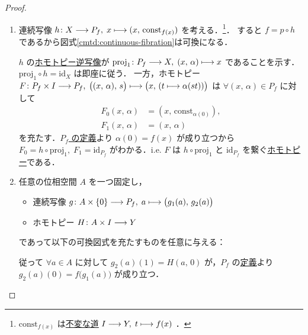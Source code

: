 \documentclass[algtopo_main]{subfiles}
\begin{document}
\begin{proof}
    \begin{enumerate}
        \item 連続写像 $h \colon X \longrightarrow P_f,\; x \longmapsto (x,\, \mathrm{const}_{f(x)})$ を考える．\footnote{$\mathrm{const}_{f(x)}$ は\hyperref[def:path-basic]{不変な道} $I \longrightarrow Y,\; t \longmapsto f(x)$ ．}．
        すると $f = p \circ h$ であるから図式\ref{cmtd:continuous-fibration}は可換になる．
        
        $h$ の\hyperref[def:homotopy-basic]{ホモトピー逆写像}が $\mathrm{proj}_1 \colon P_f \longrightarrow X,\; (x,\, \alpha) \longmapsto x$ であることを示す．
        $\mathrm{proj}_1 \circ h = \mathrm{id}_X$ は即座に従う．
        一方，ホモトピー $F \colon P_f \times I \longrightarrow P_f,\; \bigl( (x,\, \alpha),\, s \bigr) \longmapsto \bigl(x,\, (t \longmapsto \alpha(st))\bigr) $ は $\forall (x,\, \alpha) \in P_f$ に対して
        \begin{align}
            F_0(x,\, \alpha) &= (x,\, \mathrm{const}_{\alpha(0)}), \\
            F_1(x,\, \alpha) &= (x,\, \alpha)
        \end{align}
        を充たす．\hyperref[def:mapping-path-space]{$P_f$ の定義}より $\alpha(0) = f(x)$ が成り立つから $F_0 = h \circ \mathrm{proj}_1,\; F_1 = \mathrm{id}_{P_f}$ がわかる．i.e. $F$ は $h \circ \mathrm{proj}_1$ と $\mathrm{id}_{P_f}$ を繋ぐ\hyperref[def:homotopy-basic]{ホモトピー}である．
        \item 任意の位相空間 $A$ を一つ固定し，
        \begin{itemize}
            \item 連続写像 $g \colon A \times \{0\} \longrightarrow P_f,\; a \longmapsto \bigl( g_1(a),\, g_2(a) \bigr) $
            \item ホモトピー $H \colon A \times I \longrightarrow Y$
        \end{itemize}
        であって以下の可換図式を充たすものを任意に与える：
        \begin{center}
        \end{center}
        従って $\forall a \in A$ に対して $g_2(a)(1) = H(a,\, 0)$ が，$P_f$ の\hyperref[def:mapping-path-space]{定義}より $g_2(a)(0) = f\bigl(g_1(a)\bigr)$ が成り立つ．


\end{enumerate}
\end{proof}
\end{document}
